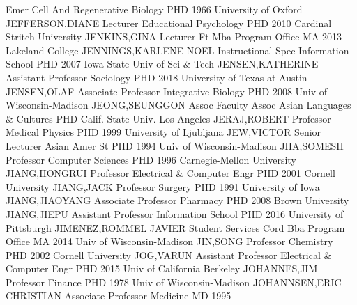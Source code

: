 \documentclass[
]{article}
\begin{document}
Emer \textbar{}  \textbar Cell And Regenerative Biology
\textbar PHD 1966 University of Oxford \textbar JEFFERSON,DIANE
\textbar Lecturer \textbar{}  \textbar Educational
Psychology \textbar PHD 2010 Cardinal Stritch University
\textbar JENKINS,GINA \textbar Lecturer \textbar{} 
\textbar Ft Mba Program Office \textbar MA 2013 Lakeland College
\textbar JENNINGS,KARLENE NOEL \textbar Instructional Spec \textbar{}
 \textbar Information School \textbar PHD 2007 Iowa State
Univ of Sci \& Tech \textbar JENSEN,KATHERINE \textbar Assistant
Professor \textbar{}  \textbar Sociology \textbar PHD 2018
University of Texas at Austin \textbar JENSEN,OLAF \textbar Associate
Professor \textbar{}  \textbar Integrative Biology
\textbar PHD 2008 Univ of Wisconsin-Madison \textbar JEONG,SEUNGGON
\textbar Assoc Faculty Assoc \textbar{}  \textbar Asian
Languages \& Cultures \textbar PHD Calif. State Univ. Los Angeles
\textbar JERAJ,ROBERT \textbar Professor \textbar{} 
\textbar Medical Physics \textbar PHD 1999 University of Ljubljana
\textbar JEW,VICTOR \textbar Senior Lecturer \textbar{} 
\textbar Asian Amer St \textbar PHD 1994 Univ of Wisconsin-Madison
\textbar JHA,SOMESH \textbar Professor \textbar{} 
\textbar Computer Sciences \textbar PHD 1996 Carnegie-Mellon University
\textbar JIANG,HONGRUI \textbar Professor \textbar{} 
\textbar Electrical \& Computer Engr \textbar PHD 2001 Cornell
University \textbar JIANG,JACK \textbar Professor \textbar{}
 \textbar Surgery \textbar PHD 1991 University of Iowa
\textbar JIANG,JIAOYANG \textbar Associate Professor \textbar{}
 \textbar Pharmacy \textbar PHD 2008 Brown University
\textbar JIANG,JIEPU \textbar Assistant Professor \textbar{}
 \textbar Information School \textbar PHD 2016 University of
Pittsburgh \textbar JIMENEZ,ROMMEL JAVIER \textbar Student Services Cord
\textbar{}  \textbar Bba Program Office \textbar MA 2014
Univ of Wisconsin-Madison \textbar JIN,SONG \textbar Professor
\textbar{}  \textbar Chemistry \textbar PHD 2002 Cornell
University \textbar JOG,VARUN \textbar Assistant Professor \textbar{}
 \textbar Electrical \& Computer Engr \textbar PHD 2015 Univ
of California Berkeley \textbar JOHANNES,JIM \textbar Professor
\textbar{}  \textbar Finance \textbar PHD 1978 Univ of
Wisconsin-Madison \textbar JOHANNSEN,ERIC CHRISTIAN \textbar Associate
Professor \textbar{}  \textbar Medicine \textbar MD 1995
\end{document}
